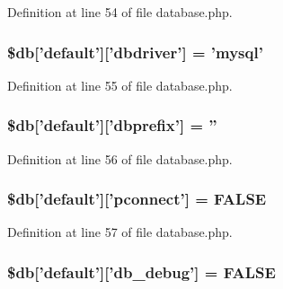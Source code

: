 Definition at line 54 of file database.\-php.

\hypertarget{production_2database_8php_a9f97429a3096d60fa26291b35f6cb7a9}{
\subsubsection[{\$db}]{\setlength{\rightskip}{0pt plus 5cm}\$db\mbox{[}'default'\mbox{]}\mbox{[}'dbdriver'\mbox{]} = 'mysql'}}\label{production_2database_8php_a9f97429a3096d60fa26291b35f6cb7a9}


Definition at line 55 of file database.\-php.

\hypertarget{production_2database_8php_ae0a3c1b4e2a1907dc70671ee97901456}{
\subsubsection[{\$db}]{\setlength{\rightskip}{0pt plus 5cm}\$db\mbox{[}'default'\mbox{]}\mbox{[}'dbprefix'\mbox{]} = ''}}\label{production_2database_8php_ae0a3c1b4e2a1907dc70671ee97901456}


Definition at line 56 of file database.\-php.

\hypertarget{production_2database_8php_a0bf35d484095b6728c2666580924569b}{
\subsubsection[{\$db}]{\setlength{\rightskip}{0pt plus 5cm}\$db\mbox{[}'default'\mbox{]}\mbox{[}'pconnect'\mbox{]} = F\-A\-L\-S\-E}}\label{production_2database_8php_a0bf35d484095b6728c2666580924569b}


Definition at line 57 of file database.\-php.

\hypertarget{production_2database_8php_aa79c6a73d78063a2b2ee6903a9851908}{
\subsubsection[{\$db}]{\setlength{\rightskip}{0pt plus 5cm}\$db\mbox{[}'default'\mbox{]}\mbox{[}'db\-\_\-debug'\mbox{]} = F\-A\-L\-S\-E}}\label{production_2database_8php_aa79c6a73d78063a2b2ee6903a9851908}


